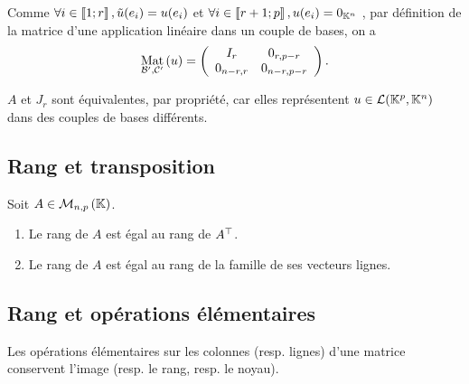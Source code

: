 \begin{dem}
\begin{itemize}
\begin{itemize}
        \end{itemize}
        Comme \(\forall i \in \left\llbracket1;r\right\rrbracket , \tilde{u}(e_i) = u(e_i)\) et \(\forall i \in \left\llbracket r+1;p\right\rrbracket , u(e_i) = 0_{\mathbb{K}^n}\) , par définition de la matrice d’une application linéaire dans un couple de bases, on a
        \[\underset{\mathcal{B}', \mathcal{C}' }{\operatorname{Mat}}\left(u\right) =
        \left( \begin{array}{cc}
        I_r & 0_{r,p-r} \\
        0_{n-r,r} & 0_{n-r,p-r}        
        \end{array} \right).\]
    \end{itemize}
    \conclusion \(A\) et \(J_r\) sont équivalentes, par propriété, car elles représentent \(u \in \mathcal{L} (\mathbb{K}^p, \mathbb{K}^n)\) dans des couples de bases différents.
\end{dem}
\subsection{Rang et transposition}
\begin{defprop}
    Soit \(A \in \M{n,p}\).
    \begin{enumerate}
        \item Le rang de \(A\) est égal au rang de \(A^{\top}\).
        \item Le rang de \(A\) est égal au rang de la famille de ses vecteurs lignes.
    \end{enumerate}
\end{defprop}
\subsection{Rang et opérations élémentaires}
\begin{defprop}
    Les opérations élémentaires sur les colonnes (resp. lignes) d’une matrice conservent l’image (resp. le rang, resp. le noyau).
\end{defprop}
